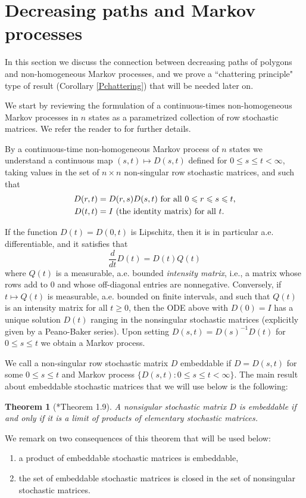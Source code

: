\documentclass[11pt]{amsart}
\newtheorem{theorem}{Theorem}[section]
\theoremstyle{remark}
\numberwithin{equation}{section}
\renewcommand{\leq}{\leqslant}
\renewcommand{\geq}{\geqslant}
\renewcommand{\le}{\leqslant}
\begin{document}
\section{Decreasing paths and Markov processes}\label{markovsec}
In this section we discuss the connection between decreasing paths of polygons and non-homogeneous Markov processes, and we prove a ``chattering principle" type of result (Corollary \ref{Pchattering}) that will be needed later on.


We start by reviewing the formulation of a continuous-times non-homogeneous Markov processes in $n$ states as a parametrized collection of row stochastic matrices. We refer the reader
to \cite{goodman} for further details.


By a continuous-time non-homogeneous Markov process of $n$ states we understand a continuous map $(s,t)\mapsto D(s,t)$ defined for $0\le s\le t<\infty$, taking values in the set of $n\times n$ non-singular row stochastic matrices, and such that
\begin{align}
\label{transitiveD}
D(r,t)&=D(r,s)D(s,t) \hbox{ for all $0\leq r\le s\le t$,}\\
D(t,t) &=I\hbox{ (the identity matrix) for all $t$}. %
\end{align}


If the function $D(t)=D(0,t)$ is Lipschitz, then it is in particular a.e. differentiable, and it satisfies that
\[
\frac{d}{dt} D(t)=D(t)Q(t)
\]
where $Q(t)$ is a measurable, a.e. bounded \emph{intensity matrix}, i.e., a matrix whose  rows add to 0 and whose off-diagonal entries are nonnegative. 
Conversely, if $t\mapsto Q(t)$ is  measurable, a.e. bounded on finite intervals, and  such that $Q(t)$ is an intensity matrix for all  $t\geq 0$, then the ODE above with $D(0)=I$ has a unique solution $D(t)$ ranging in the nonsingular stochastic matrices (explicitly given by a Peano-Baker series). Upon setting  $D(s,t)=D(s)^{-1}D(t)$ for $0\leq s\leq t$ we obtain a Markov process.

We call a non-singular row stochastic matrix $D$  embeddable if $D=D(s,t)$ for some $0\le s\le t$ and Markov process $\{D(s,t):0\leq s\leq t<\infty\}$. 
The main result about embeddable stochastic matrices that we will use below is the following:
\begin{theorem}[\cite{johansen73}*{Theorem 1.9}]\label{johansen}
A nonsigular stochastic matrix $D$ is embeddable if and only if it is a limit of products of elementary stochastic matrices. 
\end{theorem}
We remark on two consequences of this theorem that will be used below:
\begin{enumerate}   
\item a product of embeddable stochastic matrices is embeddable, 

\item the set of embeddable stochastic matrices is closed in the set of nonsingular stochastic matrices.
\end{enumerate} %
\end{document}

